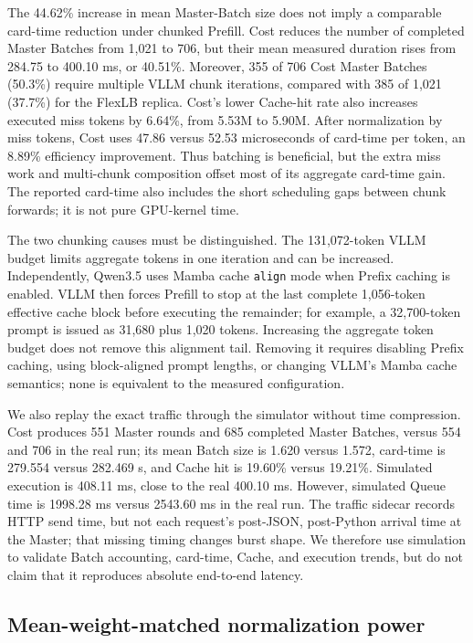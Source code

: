 \documentclass[10pt]{article}
\begin{document}
The 44.62\% increase in mean Master-Batch size does not imply a comparable
card-time reduction under chunked Prefill. Cost reduces the number of completed
Master Batches from 1,021 to 706, but their mean measured duration rises from
284.75 to 400.10 ms, or 40.51\%. Moreover, 355 of 706 Cost Master Batches
(50.3\%) require multiple VLLM chunk iterations, compared with 385 of 1,021
(37.7\%) for the FlexLB replica. Cost's lower Cache-hit rate also increases
executed miss tokens by 6.64\%, from 5.53M to 5.90M. After normalization by
miss tokens, Cost uses 47.86 versus 52.53 microseconds of card-time per token,
an 8.89\% efficiency improvement. Thus batching is beneficial, but the extra
miss work and multi-chunk composition offset most of its aggregate card-time
gain. The reported card-time also includes the short scheduling gaps between
chunk forwards; it is not pure GPU-kernel time.

The two chunking causes must be distinguished. The 131,072-token VLLM budget
limits aggregate tokens in one iteration and can be increased. Independently,
Qwen3.5 uses Mamba cache \texttt{align} mode when Prefix caching is enabled.
VLLM then forces Prefill to stop at the last complete 1,056-token effective
cache block before executing the remainder; for example, a 32,700-token prompt
is issued as 31,680 plus 1,020 tokens. Increasing the aggregate token budget
does not remove this alignment tail. Removing it requires disabling Prefix
caching, using block-aligned prompt lengths, or changing VLLM's Mamba cache
semantics; none is equivalent to the measured configuration.

We also replay the exact traffic through the simulator without time
compression. Cost produces 551 Master rounds and 685 completed Master Batches, versus
554 and 706 in the real run; its mean Batch size is 1.620 versus 1.572,
card-time is 279.554 versus 282.469 s, and Cache hit is 19.60\% versus 19.21\%.
Simulated execution is 408.11 ms, close to the real 400.10 ms. However,
simulated Queue time is 1998.28 ms versus 2543.60 ms in the real run. The
traffic sidecar records HTTP send time, but not each request's post-JSON,
post-Python arrival time at the Master; that missing timing changes burst
shape. We therefore use simulation to validate Batch accounting, card-time,
Cache, and execution trends, but do not claim that it reproduces absolute
end-to-end latency.

\subsection{Mean-weight-matched normalization power}
\end{document}
